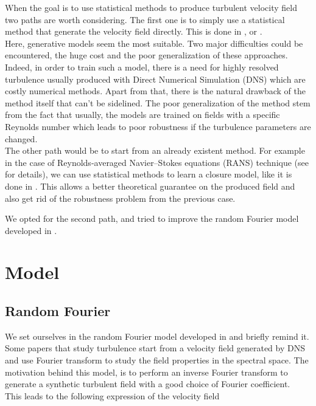 \documentclass[a4paper,12pt]{article}
\theoremstyle{definition}
\begin{document}
When the goal is to use statistical methods to produce turbulent velocity field two paths are worth considering. The first one is to simply use a statistical method that generate the velocity field directly. This is done in \cite{Yousif_Yu_Lim_2022},\cite{wang2025fourierflowfrequencyawareflowmatching} or \cite{parikh2025conditionalflowmatchinggenerative}. \\
Here, generative models seem the most suitable. Two major difficulties could be encountered, the huge cost and the poor generalization of these approaches. Indeed, in order to train such a model, there is a need for highly resolved turbulence usually produced with Direct Numerical Simulation (DNS) which are costly numerical methods. Apart from that, there is the natural drawback of the method itself that can't be sidelined. The poor generalization of the method stem from the fact that usually, the models are trained on fields with a specific Reynolds number which leads to poor robustness if the turbulence parameters are changed. \\
The other path would be to start from an already existent method. For example in the case of Reynolds-averaged Navier–Stokes equations (RANS) technique (see \cite{RANSReview} for details), we can use statistical methods to learn a closure model, like it is done in \cite{Bezgin2021}. This allows a better theoretical guarantee on the produced field and also get rid of the robustness problem from the previous case.  

\bigskip
We opted for the second path, and tried to improve the random Fourier model developed in \cite{Janin2021}.


\section{Model}

\subsection{Random Fourier}

We set ourselves in the random Fourier model developed in \cite{Janin2021} and briefly remind it. 
Some papers that study turbulence start from a velocity field generated by DNS and use Fourier transform to study the field properties in the spectral space. The motivation behind this model, is to perform an inverse Fourier transform to generate a synthetic turbulent field with a good choice of Fourier coefficient. \\
This leads to the following expression of the velocity field 
\end{document}
